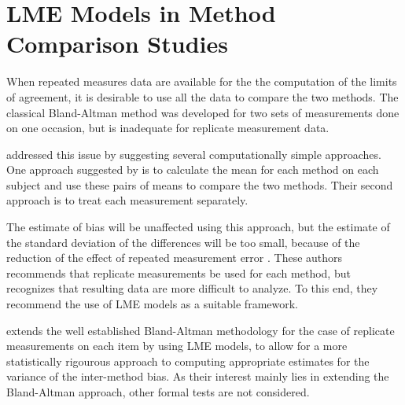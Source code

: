 \documentclass[12pt, a4paper]{report}
\theoremstyle{plain}
\theoremstyle{definition}
\theoremstyle{remark}
\begin{document}

\section{LME Models in Method Comparison Studies}
When repeated measures data are available for the the computation of the limits of agreement, it is desirable to use all the data to compare the two methods. The classical Bland-Altman method was developed for two sets of measurements done on one occasion, but is inadequate for replicate measurement data. 

\citet{BA99} addressed this issue by suggesting several computationally simple approaches.  One approach suggested by \citet{BA99} is to calculate the mean for each method on each subject and use these pairs of means to compare the two methods. Their second approach is to treat each measurement separately. 
	
The estimate of bias will be unaffected using this approach, but the estimate of the standard deviation of the differences will be too small, because of the reduction of the effect of repeated measurement error \citep{BXC2004,BXC2008}. These authors recommends that replicate measurements be used for each method, but recognizes that resulting data are more difficult to analyze. To this end, they recommend the use of LME models as a suitable framework.
	
	
	
	
	
	\citet{BXC2008} extends the well established Bland-Altman methodology for the case of replicate measurements on each item by using LME models, to allow for a more statistically rigourous approach to computing appropriate estimates for the variance of the inter-method bias. As their interest mainly lies in extending the Bland-Altman approach, other formal tests are not considered.  
	
\end{document}
